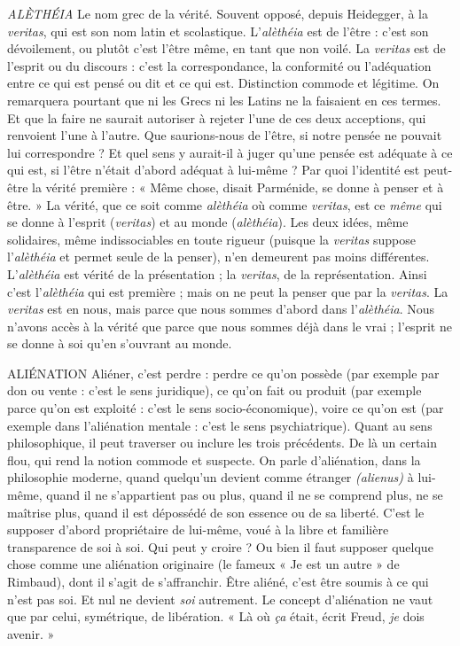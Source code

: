 {\it ALÈTHÉIA} Le nom grec de la vérité. Souvent opposé, depuis Heidegger, à la
{\it veritas}, qui est son nom latin et scolastique. L’{\it alèthéia} est de
l'être : c’est son dévoilement, ou plutôt c’est l'être même, en tant que non voilé.
La {\it veritas} est de l’esprit ou du discours : c’est la correspondance, la conformité
ou l’adéquation entre ce qui est pensé ou dit et ce qui est. Distinction commode
et légitime. On remarquera pourtant que ni les Grecs ni les Latins ne la
faisaient en ces termes. Et que la faire ne saurait autoriser à rejeter l’une de ces
deux acceptions, qui renvoient l’une à l’autre. Que saurions-nous de l'être, si
notre pensée ne pouvait lui correspondre ? Et quel sens y aurait-il à juger
qu’une pensée est adéquate à ce qui est, si l’être n’était d’abord adéquat à lui-même ?
Par quoi l’identité est peut-être la vérité première : « Même chose,
disait Parménide, se donne à penser et à être. » La vérité, que ce soit comme
{\it alèthéia} où comme {\it veritas}, est ce {\it même} qui se donne à l'esprit ({\it veritas}) et au
monde ({\it alèthéia}). Les deux idées, même solidaires, même indissociables en
toute rigueur (puisque la {\it veritas} suppose l’{\it alèthéia} et permet seule de la penser),
n’en demeurent pas moins différentes. L’{\it alèthéia} est vérité de la présentation ;
la {\it veritas}, de la représentation. Ainsi c’est l’{\it alèthéia} qui est première ; mais on
ne peut la penser que par la {\it veritas}. La {\it veritas} est en nous, mais parce que nous
sommes d’abord dans l’{\it alèthéia}. Nous n’avons accès à la vérité que parce que
nous sommes déjà dans le vrai ; l'esprit ne se donne à soi qu’en s’ouvrant au
monde.

ALIÉNATION  Aliéner, c’est perdre : perdre ce qu’on possède (par exemple
par don ou vente : c’est le sens juridique), ce qu’on fait ou
produit (par exemple parce qu’on est exploité : c’est le sens socio-économique),
voire ce qu’on est (par exemple dans l’aliénation mentale : c’est le sens psychiatrique).
Quant au sens philosophique, il peut traverser ou inclure les trois précédents.
De là un certain flou, qui rend la notion commode et suspecte. On
parle d’aliénation, dans la philosophie moderne, quand quelqu'un devient
comme étranger {\it (alienus)} à lui-même, quand il ne s’appartient pas ou plus,
quand il ne se comprend plus, ne se maîtrise plus, quand il est dépossédé de son
essence ou de sa liberté. C’est le supposer d’abord propriétaire de lui-même,
voué à la libre et familière transparence de soi à soi. Qui peut y croire ? Ou bien
il faut supposer quelque chose comme une aliénation originaire (le fameux « Je
est un autre » de Rimbaud), dont il s’agit de s’affranchir. Être aliéné, c’est être
soumis à ce qui n'est pas soi. Et nul ne devient {\it soi} autrement. Le concept d’aliénation
ne vaut que par celui, symétrique, de libération. « Là où {\it ça} était, écrit
Freud, {\it je} dois avenir. »

